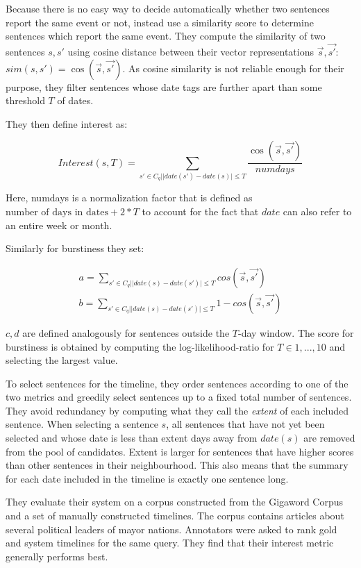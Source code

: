 \documentclass[a4paper,BCOR=10mm]{report}
\numberwithin{lemma}{chapter}
\numberwithin{definition}{chapter}
\begin{document}
Because there is no easy way to decide automatically whether two sentences report the same event or not, \citeauthor{chieu} instead use a similarity score to determine sentences which report the same event. They compute the similarity of two sentences $s, s'$ using cosine distance between their vector representations $\vec{s}, \vec{s'}$: $\mathit{sim}(s, s') = \cos(\vec{s}, \vec{s'})$.
As cosine similarity is not reliable enough for their purpose, they filter sentences whose date tags are further apart than some threshold $T$ of dates.

They then define interest as:

\begin{equation}
\mathit{Interest}(s, T) = \sum_{s' \in C_q | |\mathit{date}(s') - \mathit{date}(s)| \leq T} \frac{\cos(\vec{s}, \vec{s'})}{\mathit{numdays}}
\end{equation}

Here, numdays is a normalization factor that is defined as $\text{number of days in dates} + 2 * T$ to account for the fact that $\mathit{date}$ can also refer to an entire week or month.

Similarly for burstiness they set:

\begin{align}
a = \sum_{s' \in C_q | |\mathit{date}(s) - \mathit{date}(s')| \leq T} \mathit{cos}(\vec{s}, \vec{s'}) \\
b = \sum_{s' \in C_q | |\mathit{date}(s) - \mathit{date}(s')| \leq T} 1 - \mathit{cos}(\vec{s}, \vec{s'})
\end{align}

$c, d$ are defined analogously for sentences outside the $T$-day window. The score for burstiness is obtained by computing the log-likelihood-ratio for $T \in 1, ..., 10$ and selecting the largest value.

To select sentences for the timeline, they order sentences according to one of the two metrics and greedily select sentences up to a fixed total number of sentences.
They avoid redundancy by computing what they call the \textit{extent} of each included sentence. When selecting a sentence $s$, all sentences that have not yet been selected and whose date is less than extent days away from $\mathit{date}(s)$ are removed from the pool of candidates. Extent is larger for sentences that have higher scores than other sentences in their neighbourhood.
This also means that the summary for each date included in the timeline is exactly one sentence long.

They evaluate their system on a corpus constructed from the Gigaword Corpus \citep{gigaword} and a set of manually constructed timelines. The corpus contains articles about several political leaders of mayor nations. Annotators were asked to rank gold and system timelines for the same query.
They find that their interest metric generally performs best.
\end{document}
